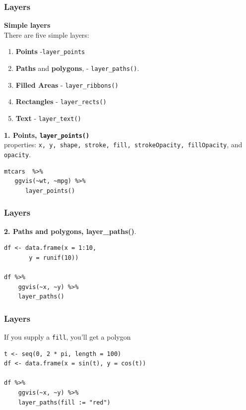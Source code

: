 \documentclass[MASTER.tex]{subfiles}
\begin{document}
\begin{frame}[fragile]
\frametitle{Layers}
\Large
\vspace{-0.5cm}
\textbf{Simple layers}\\
There are five simple layers:

\begin{enumerate}
\item \textbf{Points} -\texttt{layer\_points}
\item \textbf{Paths} and \textbf{polygons}, - \texttt{layer\_paths()}.
\item \textbf{Filled Areas} - \texttt{layer\_ribbons()}
\item \textbf{Rectangles} - \texttt{layer\_rects()}
\item \textbf{Text} - \texttt{layer\_text()}\end{enumerate}

\end{frame}
\begin{frame}[fragile]
	\Large
\textbf{1. Points, \texttt{layer\_points()}}
\\ properties: \texttt{x, y, shape, stroke, fill, strokeOpacity, fillOpacity}, and \texttt{opacity}.

\begin{framed}
\begin{verbatim}
mtcars  %>% 
   ggvis(~wt, ~mpg) %>% 
      layer_points()
\end{verbatim}
\end{framed}
\end{frame}
\begin{frame}[fragile]
	\frametitle{Layers}
	\Large
\vspace{-0.4cm}
\textbf{2. Paths and polygons, layer\_paths()}.\\
\begin{framed}
	\begin{verbatim}
df <- data.frame(x = 1:10, 
       y = runif(10))

df %>% 
    ggvis(~x, ~y) %>% 
    layer_paths()
\end{verbatim}
\end{framed}
\end{frame}
\begin{frame}[fragile]
	\frametitle{Layers}
\Large
If you supply a \texttt{fill}, you’ll get a polygon
\begin{framed}
	\begin{verbatim}
t <- seq(0, 2 * pi, length = 100)
df <- data.frame(x = sin(t), y = cos(t))

df %>% 
    ggvis(~x, ~y) %>% 
    layer_paths(fill := "red")
\end{verbatim}
\end{framed}
\end{frame}
\end{document}
